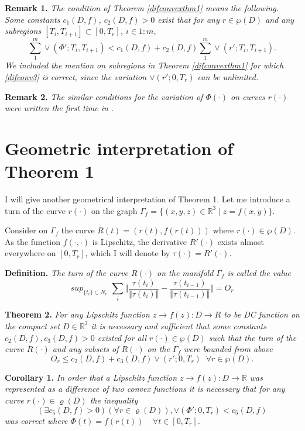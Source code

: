 \documentclass[12pt]{llncs}
\begin{document}
{\bf Remark 1.} {\em The condition of Theorem \ref{difconvexthm1}
means the following. Some constants  $ c_1(D,f)$, $c_2(D,f)>0 $ exist
that for any $r \in \wp(D)$ and any subregions $[T_i, T_{i+1} ]
\subset [0, T_r] $, $i \in 1:m,$
$$
 \sum_1^m \vee (\Phi'; T_i,T_{i+1})<  c_1(D,f) + c_2(D,f) \sum_1^m \vee (r';
 T_i,T_{i+1}).
$$
We included the mention on subregions in Theorem
\ref{difconvexthm1} for which  \ref{difconv3} is correct,  since
the variation $\vee (r'; 0,T_r)$ can be unlimited.}

{\bf Remark 2.} {\em The similar conditions for the variation of
$\Phi (\cdot)$ on curves $r(\cdot)$ were written the first time in
\cite{proudconvex1}}.

\section{Geometric interpretation of Theorem 1}


I will give another geometrical interpretation of  Theorem 1. Let
me introduce a turn of the curve $ r(\cdot)$  on the graph
$\Gamma_f = \{(x,y,z) \in \mathbb{R}^3 \mid z = f(x , y)\} .$

Consider on $\Gamma_f$  the curve $ R(t)=(r(t),f(r(t)))$  where
$r(\cdot) \in \wp(D).$  As the function $f(\cdot,\cdot)$ is
Lipschitz, the derivative $R'(\cdot)$  exists almost everywhere on
$[0,T_r]$,  which I will denote by $\tau(\cdot)=R'(\cdot).$

{\bf Definition.} {\em The turn of the curve $R(\cdot)$  on the
manifold $\Gamma_f$ is called the value
$$
sup_{ \{t_i\} \subset N_r} \,\, \sum_i \Vert
\frac{\tau(t_i)}{\Vert \tau (t_i) \Vert }  -
\frac{\tau(t_{i-1})}{\Vert \tau(t_{i-1}) \Vert } \Vert = O_r
$$ }

{\bf Theorem 2.} {\em For any Lipschitz function $z \rightarrow
f(z) :D \rightarrow R$ to be DC function on the compact set $ D
\in \mathbb{R}^2$ it is necessary and sufficient that some
constants $c_2(D,f), c_3(D,f)>0$ existed for all $r(\cdot) \in
\wp(D)$ such that the turn of the curve $R(\cdot)$ and any subsets
of $R(\cdot)$ on the $\Gamma_f$ were bounded from above
\begin{equation} O_r \leq c_2(D,f) + c_3(D,f) \vee(r';0,T_r)
\;\; \forall r \in \wp(D). \label{difconv6} \end{equation}
\label{difconvexthm2} }

{\bf Corollary 1.} {\em In order that a Lipschitz function $z
\rightarrow f(z):D \rightarrow \mathbb{R}$ was represented as a
difference of two convex functions it is necessary  that for any
curve $r(\cdot) \in \varrho(D)$  the inequality
$$
 (\exists c_5(D,f)>0) (\forall r \in \varrho(D)) ,
 \vee (\Phi'; 0,T_r)<  c_5(D,f)
$$
was correct where $\Phi(t)=f(r(t)) \;\;\;\; \forall t \in
[0,T_r]$.}
\end{document}
